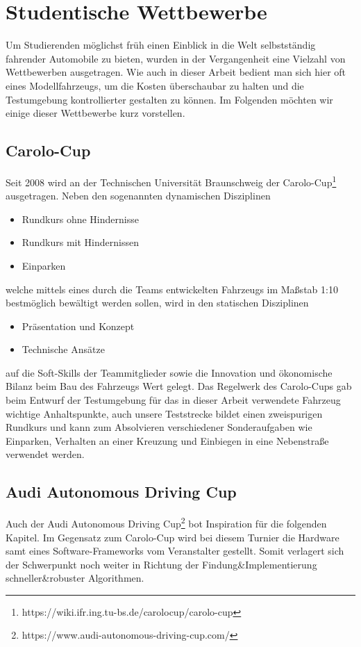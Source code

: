 \section{Studentische Wettbewerbe \dcsecondauthorshort}
Um Studierenden möglichst früh einen Einblick in die Welt selbstständig fahrender Automobile zu bieten, wurden in der Vergangenheit eine Vielzahl von Wettbewerben ausgetragen. Wie auch in dieser Arbeit bedient man sich hier oft eines Modellfahrzeugs, um die Kosten überschaubar zu halten und die Testumgebung kontrollierter gestalten zu können. Im Folgenden möchten wir einige dieser Wettbewerbe kurz vorstellen.
\subsection{Carolo-Cup}
\label{sssec:carolo_cup}
Seit 2008 wird an der Technischen Universität Braunschweig der Carolo-Cup\footnote{https://wiki.ifr.ing.tu-bs.de/carolocup/carolo-cup} ausgetragen. Neben den sogenannten dynamischen Disziplinen
\begin{itemize}
\item Rundkurs ohne Hindernisse
\item Rundkurs mit Hindernissen
\item Einparken
\end{itemize}
welche mittels eines durch die Teams entwickelten Fahrzeugs im Maßstab 1:10 bestmöglich bewältigt werden sollen, wird in den statischen Disziplinen
\begin{itemize}
\item Präsentation und Konzept
\item Technische Ansätze
\end{itemize}
auf die Soft-Skills der Teammitglieder sowie die Innovation und ökonomische Bilanz beim Bau des Fahrzeugs Wert gelegt. Das Regelwerk des Carolo-Cups gab beim Entwurf der Testumgebung für das in dieser Arbeit verwendete Fahrzeug wichtige Anhaltspunkte, auch unsere Teststrecke bildet einen zweispurigen Rundkurs und kann zum Absolvieren verschiedener Sonderaufgaben wie Einparken, Verhalten an einer Kreuzung und Einbiegen in eine Nebenstraße verwendet werden.

\subsection{Audi Autonomous Driving Cup}
Auch der Audi Autonomous Driving Cup\footnote{https://www.audi-autonomous-driving-cup.com/} bot Inspiration für die folgenden Kapitel. Im Gegensatz zum Carolo-Cup wird bei diesem Turnier die Hardware samt eines Software-Frameworks vom Veranstalter gestellt. Somit verlagert sich der Schwerpunkt noch weiter in Richtung der Findung\&Implementierung schneller\&robuster Algorithmen. 

